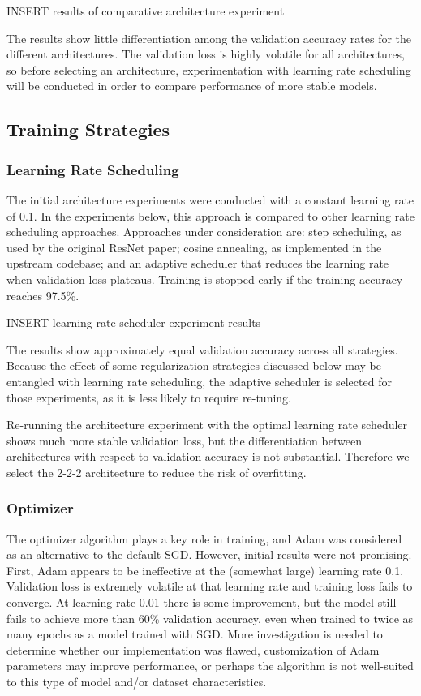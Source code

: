 \documentclass[letterpaper]{article} %
\begin{document}
INSERT results of comparative architecture experiment

The results show little differentiation among the validation accuracy rates for the different architectures.
The validation loss is highly volatile for all architectures, so before selecting an architecture, experimentation
with learning rate scheduling will be conducted in order to compare performance of more stable models.

\subsection{Training Strategies}

\subsubsection{Learning Rate Scheduling}

The initial architecture experiments were conducted with a constant learning rate of 0.1.
In the experiments below, this approach is compared to other learning rate scheduling approaches.
Approaches under consideration are: step scheduling, as used by the original ResNet paper; cosine annealing, as
implemented in the upstream codebase; and an adaptive scheduler that reduces the learning rate when validation loss
plateaus.
Training is stopped early if the training accuracy reaches 97.5\%.

INSERT learning rate scheduler experiment results

The results show approximately equal validation accuracy across all strategies.
Because the effect of some regularization strategies discussed below may be entangled with learning rate scheduling,
the adaptive scheduler is selected for those experiments, as it is less likely to require re-tuning.

Re-running the architecture experiment with the optimal learning rate scheduler shows much more stable validation loss,
but the differentiation between architectures with respect to validation accuracy is not substantial.
Therefore we select the 2-2-2 architecture to reduce the risk of overfitting.

\subsubsection{Optimizer}

The optimizer algorithm plays a key role in training, and Adam was considered as an alternative to the default SGD.
However, initial results were not promising.
First, Adam appears to be ineffective at the (somewhat large) learning rate 0.1. Validation loss is extremely volatile
at that learning rate and training loss fails to converge.
At learning rate 0.01 there is some improvement, but the model still fails to achieve more than 60\% validation
accuracy, even when trained to twice as many epochs as a model trained with SGD. More investigation is needed to
determine whether our implementation was flawed, customization of Adam parameters may improve performance, or perhaps
the algorithm is not well-suited to this type of model and/or dataset characteristics.
\end{document}
